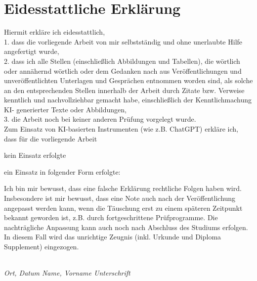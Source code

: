 \thispagestyle{empty}
\chapter*{Eidesstattliche Erklärung}



Hiermit erkläre ich eidesstattlich, \\

1. dass die vorliegende Arbeit von mir selbstständig und ohne unerlaubte Hilfe angefertigt wurde, \\
2. dass ich alle Stellen (einschließlich Abbildungen und Tabellen), die wörtlich oder annähernd wörtlich oder dem Gedanken nach aus Veröffentlichungen und unveröffentlichten Unterlagen und Gesprächen entnommen worden sind, als solche an den entsprechenden Stellen innerhalb der Arbeit durch Zitate bzw. Verweise kenntlich und nachvollziehbar gemacht habe, einschließlich der Kenntlichmachung KI- generierter Texte oder Abbildungen, \\
3. die Arbeit noch bei keiner anderen Prüfung vorgelegt wurde. \\
Zum Einsatz von KI-basierten Instrumenten (wie z.B. ChatGPT) erkläre ich, dass für die vorliegende Arbeit 
    
\begin{checklist}
    \item[\wontfix] kein Einsatz erfolgte
    \item ein Einsatz in folgender Form erfolgte:
\end{checklist} 

Ich bin mir  bewusst, dass eine falsche Erklärung rechtliche Folgen haben wird. Insbesondere ist mir bewusst, dass eine Note auch nach der Veröffentlichung angepasst werden kann, wenn die Täuschung erst zu einem späteren Zeitpunkt bekannt geworden ist, z.B. durch fortgeschrittene Prüfprogramme. Die nachträgliche Anpassung kann auch noch nach Abschluss des Studiums erfolgen. In diesem Fall wird das unrichtige Zeugnis (inkl. Urkunde und  Diploma Supplement) eingezogen.

{\raggedright
\vspace{2.5cm}

\hrulefill \hspace{1cm} \hrulefill \hspace{1cm} \hrulefill \\ 

\textit{Ort, Datum \hspace{3.25cm} Name, Vorname \hspace{2.6cm} Unterschrift}}